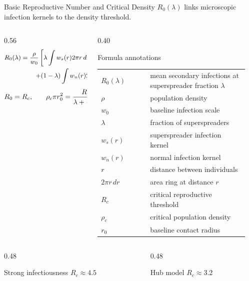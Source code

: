 \documentclass[aspectratio=169,10pt]{beamer}
\newcommand{\tagline}[1]{%
  \vspace{0.25em}
  {\color{Muted}\large #1}
}
\begin{document}
\begin{frame}{Basic Reproductive Number and Critical Density}
  \tagline{$R_0(\lambda)$ links microscopic infection kernels to the density threshold.}
  \vspace{0.3em}
  \begin{columns}[T,totalwidth=\linewidth]
    \begin{column}{0.56\linewidth}
      \[
      \small
      \begin{aligned}
      R_0(\lambda)
      &=\frac{\rho}{w_0}
      \left[
        \lambda \int w_s(r)2\pi r\,dr\right.\\[-0.2em]
      &\qquad\left.
        +(1-\lambda)\int w_n(r)2\pi r\,dr
      \right].
      \end{aligned}
      \]
      \[
        \small
        R_0=R_c,\qquad
        \rho_c\pi r_0^2=
        \frac{R_c}{\lambda+\frac{1-\lambda}{6}}.
      \]
    \end{column}
    \begin{column}{0.40\linewidth}
      \begin{block}{Formula annotations}
        \tiny
        \begin{tabular}{@{}p{0.31\linewidth}p{0.62\linewidth}@{}}
          $R_0(\lambda)$ & mean secondary infections at superspreader fraction $\lambda$\\
          $\rho$ & population density\\
          $w_0$ & baseline infection scale\\
          $\lambda$ & fraction of superspreaders\\
          $w_s(r)$ & superspreader infection kernel\\
          $w_n(r)$ & normal infection kernel\\
          $r$ & distance between individuals\\
          $2\pi r\,dr$ & area ring at distance $r$\\
          $R_c$ & critical reproductive threshold\\
          $\rho_c$ & critical population density\\
          $r_0$ & baseline contact radius\\
        \end{tabular}
      \end{block}
    \end{column}
  \end{columns}
  \vspace{0.35em}
  \begin{columns}[T,totalwidth=\linewidth]
    \begin{column}{0.48\linewidth}
      \begin{block}{Strong infectiousness}
        $R_c \approx 4.5$
      \end{block}
    \end{column}
    \begin{column}{0.48\linewidth}
      \begin{block}{Hub model}
        $R_c \approx 3.2$
      \end{block}
    \end{column}
  \end{columns}
\end{frame}
\end{document}
